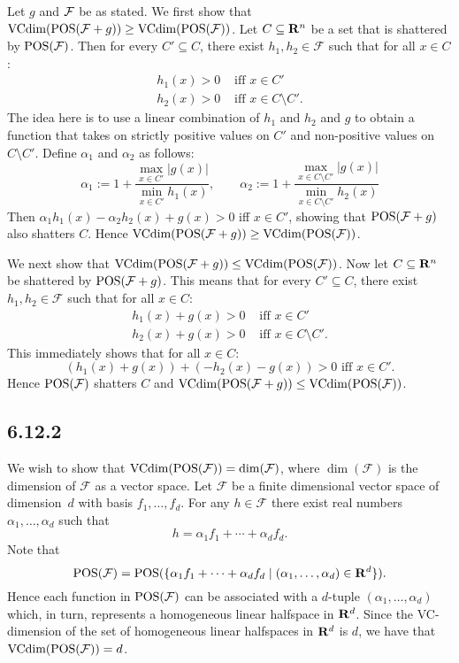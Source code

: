 Let $g$ and $\cal F$ be as stated. We first show that 
$\text{VCdim}(\operatorname{POS}(\mathcal{F} + g)) \geq \text{VCdim} (\operatorname{POS} (\mathcal{F}) )$. Let $C \subseteq \mathbf{R}^n$ be a 
set that is shattered by $\operatorname{POS}(\mathcal{F})$. Then for every $C' \subseteq C$, there exist
$h_1, h_2 \in \mathcal{F}$ such that for all $x \in C$:
\begin{align*}
    h_1(x) > 0 & \text { iff } x \in C' \\
    h_2(x) > 0 & \text{ iff } x \in C \setminus C'.
\end{align*}
The idea here is to use a linear combination of $h_1$ and $h_2$ and $g$ to obtain a function
that takes on strictly positive values on $C'$ and non-positive values on $C \setminus C'$. 
Define $\alpha_1$ and $\alpha_2$ as follows:
\[
\alpha_1 := 1 + \frac{\max_{x \in C'} |g(x)|}{\min_{x \in C'} h_1(x)}, \qquad 
\alpha_2 := 1 + \frac{{\max_{x \in C \setminus C'} |g(x)|}}{\min_{x \in C \setminus C'} h_2(x)}
\]
Then $\alpha_1 h_1(x) - \alpha_2 h_2(x) + g(x) > 0$ iff $x \in C'$, showing that
$\operatorname{POS} (\mathcal{F} + g)$ also shatters $C$. Hence 
$\text{VCdim}(\operatorname{POS}(\mathcal{F} + g)) \geq \text{VCdim} (\operatorname{POS} (\mathcal{F}) )$.

We next show that $\text{VCdim}(\operatorname{POS}(\mathcal{F} + g)) \leq \text{VCdim} (\operatorname{POS} (\mathcal{F}) )$. Now let 
$C \subseteq \mathbf{R}^n$ be shattered by $\operatorname{POS}(\mathcal{F} + g)$. This means that 
for every $C' \subseteq C$, there exist $h_1, h_2 \in \mathcal{F}$ such that for 
all $x \in C$:
\begin{align*}
    h_1(x) + g(x) > 0 & \text { iff } x \in C' \\
    h_2(x) + g(x) > 0 & \text{ iff } x \in C \setminus C'.
\end{align*}
This immediately shows that for all $x \in C$:
\[
    (h_1(x) + g(x)) + (- h_2(x) - g(x)) > 0 \text { iff } x \in C'. 
\]
Hence $\operatorname{POS} (\mathcal{F})$ shatters $C$ and
$\text{VCdim}(\operatorname{POS}(\mathcal{F} + g)) \leq \text{VCdim} (\operatorname{POS} (\mathcal{F}) )$. 

\subsection*{6.12.2}

 We wish to show that $\text{VCdim} (\operatorname{POS} (\mathcal{F})) = \dim (\mathcal{F})$, where 
 $\dim (\mathcal{F})$ is the dimension of $\mathcal{F}$ as a vector space. Let 
 $\mathcal{F}$ be a finite dimensional vector space of dimension~$d$ with basis
 $f_1, \ldots, f_d$. For any $h \in \mathcal{F}$ there exist real numbers 
 $\alpha_1, \ldots, \alpha_d$ such that
 \[
    h = \alpha_1 f_1 + \cdots + \alpha_d f_d.
 \]
Note that 
\[
    \operatorname{POS} (\mathcal{F}) = \operatorname{POS} (\{ \alpha_1 f_1 + \cdots + \alpha_d f_d 
        \mid (\alpha_1, \ldots, \alpha_d) \in \mathbf{R}^d\}).
\]
Hence each function in $\operatorname{POS} (\mathcal{F} )$ can be associated with a $d$-tuple 
$(\alpha_1, \ldots, \alpha_d)$ which, in turn, represents a homogeneous linear 
halfspace in $\mathbf{R}^d$. Since the VC-dimension of the set of homogeneous linear
halfspaces in $\mathbf{R}^d$ is $d$, we have that $\text{VCdim} (\operatorname{POS} (\mathcal{F})) = d$.


